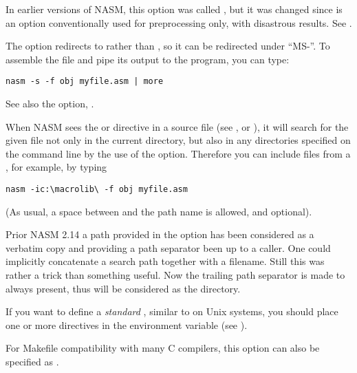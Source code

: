 In earlier versions of NASM, this option was called ,
but it was changed since  is an option conventionally
used for preprocessing only, with disastrous results.
See .


The  option redirects  to
 rather than , so it can be redirected
under ``MS-''. To assemble the file 
and pipe its output to the  program, you can type:

\begin{lstlisting}
nasm -s -f obj myfile.asm | more
\end{lstlisting}

See also the  option, .


When NASM sees the  or  directive
in a source file (see ,  or
), it will search for the given file not only in the
current directory, but also in any directories specified on the command
line by the use of the  option. Therefore you can include files
from a , for example, by typing

\begin{lstlisting}
nasm -ic:\macrolib\ -f obj myfile.asm
\end{lstlisting}

(As usual, a space between  and the path name is allowed, and
optional).

Prior NASM 2.14 a path provided in the option has been considered as
a verbatim copy and providing a path separator been up to a caller.
One could implicitly concatenate a search path together with a filename.
Still this was rather a trick than something useful. Now the trailing
path separator is made to always present, thus  will be
considered as the  directory.

If you want to define a \emph{standard} ,
similar to  on Unix systems, you should place one or
more  directives in the  environment variable (see
).

For Makefile compatibility with many C compilers, this option can also
be specified as .

